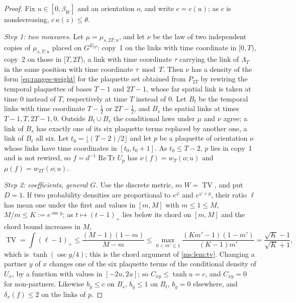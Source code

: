 \documentclass[11pt,a4paper]{amsart}
\theoremstyle{definition}
\theoremstyle{remark}
\numberwithin{equation}{section}
\DeclareMathOperator{\ReTr}{Re\,Tr}  %
\DeclareMathOperator{\TV}{TV}        %
\DeclareMathOperator{\osc}{osc}      %
\newcommand{\betaW}{\beta_{W}}             %
\begin{document}
\begin{proof}
Fix $u\in[0,\betaW]$ and an orientation $o$, and write $c=c(u)$; as $c$ is nondecreasing, $c\,\kappa(z)\le\theta$.

\emph{Step 1: two measures.} Let $\mu=\mu_{s,2T;u}$, and let $\nu$ be the law of two independent copies of $\mu_{s,T;u}$ placed on $G^{E_{2T}}$: copy~1 on the links with time coordinate in $[0,T)$, copy~2 on those in $[T,2T)$, a link with time coordinate $\tau$ carrying the link of $\Lambda_T$ in the same position with time coordinate $\tau\bmod T$. Then $\nu$ has a density of the form \eqref{eq:ranges-weight} for the plaquette set obtained from $P_{2T}$ by rewiring the temporal plaquettes of bases $T-1$ and $2T-1$, whose far spatial link is taken at time $0$ instead of $T$, respectively at time $T$ instead of $0$. Let $B_t$ be the temporal links with time coordinate $T-\frac12$ or $2T-\frac12$, and $B_s$ the spatial links at times $T-1,T,2T-1,0$. Outside $B_t\cup B_s$ the conditional laws under $\mu$ and $\nu$ agree; a link of $B_s$ has exactly one of its six plaquette terms replaced by another one, a link of $B_t$ all six. Let $t_0=\lfloor(T-2)/2\rfloor$ and let $p$ be a plaquette of orientation $o$ whose links have time coordinates in $[t_0,t_0+1]$. As $t_0\le T-2$, $p$ lies in copy~1 and is not rewired, so $f=d^{-1}\ReTr U_p$ has $\nu(f)=w_T(o;u)$ and $\mu(f)=w_{2T}(o;u)$.

\emph{Step 2: coefficients, general $G$.} Use the discrete metric, so $W=\TV$, and put $D=1$. If two probability densities are proportional to $e^{\varphi}$ and $e^{\varphi+g}$, their ratio $\ell$ has mean one under the first and values in $[m,M]$ with $m\le1\le M$, $M/m\le K:=e^{\osc g}$; as $t\mapsto(t-1)_+$ lies below its chord on $[m,M]$ and the chord bound increases in $M$,
\[
\TV=\int(\ell-1)_+\le\frac{(M-1)(1-m)}{M-m}\le\max_{0<m'\le1}\frac{(Km'-1)(1-m')}{(K-1)m'}=\frac{\sqrt K-1}{\sqrt K+1},
\]
which is $\tanh(\osc g/4)$; this is the chord argument of \cref{ms:lem:tv}. Changing a partner $y$ of $x$ changes one of the six plaquette terms of the conditional density of $U_x$, by a function with values in $[-2u,2u]$; so $C_{xy}\le\tanh u=c$, and $C_{xy}=0$ for non-partners. Likewise $b_y\le c$ on $B_s$, $b_y\le1$ on $B_t$, $b_y=0$ elsewhere, and $\delta_x(f)\le2$ on the links of $p$.


\end{proof}
\end{document}
